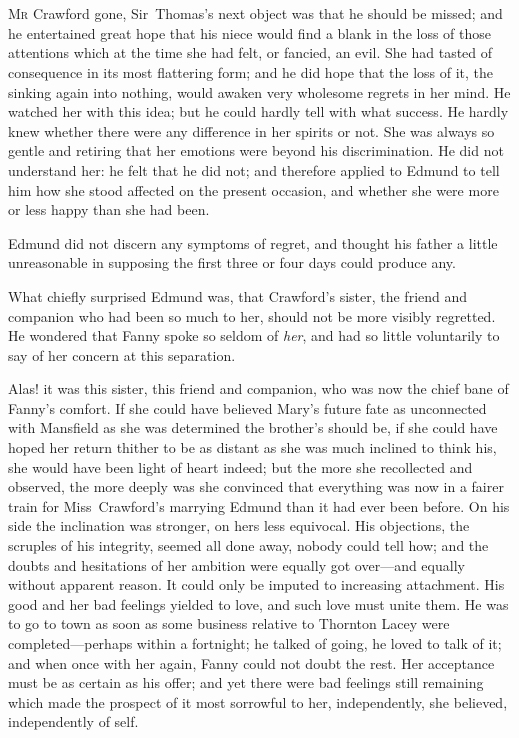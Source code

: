 \chapter[Chapter \thechapter]{} 

 \lettrine[lraise=0.3]{M}{r} Crawford gone, Sir~Thomas's next object was that he should be missed; and he entertained great hope that his niece would find a blank in the loss of those attentions which at the time she had felt, or fancied, an evil. She had tasted of consequence in its most flattering form; and he did hope that the loss of it, the sinking again into nothing, would awaken very wholesome regrets in her mind. He watched her with this idea; but he could hardly tell with what success. He hardly knew whether there were any difference in her spirits or not. She was always so gentle and retiring that her emotions were beyond his discrimination. He did not understand her: he felt that he did not; and therefore applied to Edmund to tell him how she stood affected on the present occasion, and whether she were more or less happy than she had been.

Edmund did not discern any symptoms of regret, and thought his father a little unreasonable in supposing the first three or four days could produce any.

What chiefly surprised Edmund was, that Crawford's sister, the friend and companion who had been so much to her, should not be more visibly regretted. He wondered that Fanny spoke so seldom of \textit{her}, and had so little voluntarily to say of her concern at this separation.

Alas! it was this sister, this friend and companion, who was now the chief bane of Fanny's comfort. If she could have believed Mary's future fate as unconnected with Mansfield as she was determined the brother's should be, if she could have hoped her return thither to be as distant as she was much inclined to think his, she would have been light of heart indeed; but the more she recollected and observed, the more deeply was she convinced that everything was now in a fairer train for Miss~Crawford's marrying Edmund than it had ever been before. On his side the inclination was stronger, on hers less equivocal. His objections, the scruples of his integrity, seemed all done away, nobody could tell how; and the doubts and hesitations of her ambition were equally got over—and equally without apparent reason. It could only be imputed to increasing attachment. His good and her bad feelings yielded to love, and such love must unite them. He was to go to town as soon as some business relative to Thornton Lacey were completed—perhaps within a fortnight; he talked of going, he loved to talk of it; and when once with her again, Fanny could not doubt the rest. Her acceptance must be as certain as his offer; and yet there were bad feelings still remaining which made the prospect of it most sorrowful to her, independently, she believed, independently of self.

